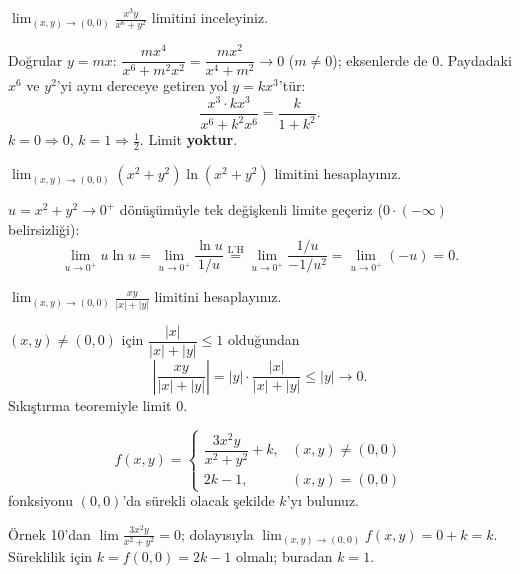 \begin{soru}
$\displaystyle\lim_{(x,y)\to(0,0)}\frac{x^3y}{x^6+y^2}$ limitini inceleyiniz.
\end{soru}
\begin{cevap}
Doğrular $y=mx$: $\dfrac{mx^4}{x^6+m^2x^2}=\dfrac{mx^2}{x^4+m^2}\to0$ ($m\neq0$); eksenlerde de $0$.
Paydadaki $x^6$ ve $y^2$'yi aynı dereceye getiren yol $y=kx^3$'tür:
\[
\frac{x^3\cdot kx^3}{x^6+k^2x^6}=\frac{k}{1+k^2}.
\]
$k=0\Rightarrow0$, $k=1\Rightarrow\frac12$. Limit \textbf{yoktur}.
\end{cevap}

\begin{soru}
$\displaystyle\lim_{(x,y)\to(0,0)}(x^2+y^2)\ln(x^2+y^2)$ limitini hesaplayınız.
\end{soru}
\begin{cevap}
$u=x^2+y^2\to0^+$ dönüşümüyle tek değişkenli limite geçeriz ($0\cdot(-\infty)$ belirsizliği):
\[
\lim_{u\to0^+}u\ln u=\lim_{u\to0^+}\frac{\ln u}{1/u}\overset{\text{L'H}}{=}\lim_{u\to0^+}\frac{1/u}{-1/u^2}
=\lim_{u\to0^+}(-u)=0 .
\]
\end{cevap}

\begin{soru}
$\displaystyle\lim_{(x,y)\to(0,0)}\frac{xy}{|x|+|y|}$ limitini hesaplayınız.
\end{soru}
\begin{cevap}
$(x,y)\neq(0,0)$ için $\dfrac{|x|}{|x|+|y|}\le1$ olduğundan
\[
\left|\frac{xy}{|x|+|y|}\right|=|y|\cdot\frac{|x|}{|x|+|y|}\le|y|\to0 .
\]
Sıkıştırma teoremiyle limit $0$.
\end{cevap}

\begin{soru}
\[
f(x,y)=\begin{cases}\dfrac{3x^2y}{x^2+y^2}+k, & (x,y)\neq(0,0)\\[6pt] 2k-1, & (x,y)=(0,0)\end{cases}
\]
fonksiyonu $(0,0)$'da sürekli olacak şekilde $k$'yı bulunuz.
\end{soru}
\begin{cevap}
Örnek 10'dan $\lim\frac{3x^2y}{x^2+y^2}=0$; dolayısıyla $\lim_{(x,y)\to(0,0)}f(x,y)=0+k=k$. Süreklilik için
$k=f(0,0)=2k-1$ olmalı; buradan $\boxed{k=1}$.
\end{cevap}

